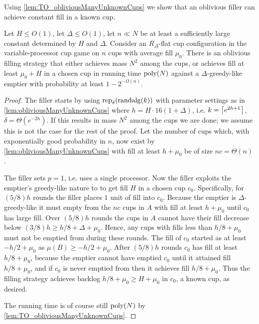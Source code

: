 Using \cref{lem:TO_obliviousManyUnknownCups} we show that an
oblivious filler can achieve constant fill in a known cup.
\begin{proposition}
  \label{prop:TO_obliviousBase}
  Let $H \le O(1)$, let $\Delta \le O(1)$, let $n\ll N$ be at least a
  sufficiently large constant determined by $H$ and $\Delta$. 
  Consider an $R_\Delta$-flat cup configuration in the variable-processor cup
  game on $n$ cups with average fill $\mu_0$.
  There is an oblivious filling strategy that either
  achieves mass $N^2$ among the cups, or achieves fill at least $\mu_0 + H$
  in a chosen cup in running time $\operatorname{\text{poly}}(N)$ against a
  $\Delta$-greedy-like emptier with probability at least $1-2^{-\Omega(n)}.$
\end{proposition}
\begin{proof}
  The filler starts by using $\operatorname{\text{\textup{rep}}}_\delta(\operatorname{\text{\textup{randalg}}}(k))$ with
  parameter settings as in \cref{lem:obliviousManyUnknownCups}
  where $h = H\cdot 16(1+\Delta)$, i.e. $k = \left\lceil e^{2h+1} \right\rceil$,
  $\delta = \Theta(e^{-2h})$. 
  If this results in mass $N^2$ among the cups we are done; we
  assume this is not the case for the rest of the proof.
  Let the number of cups which, with exponentially good
  probability in $n$, now exist by
  \cref{lem:obliviousManyUnknownCups} with
  fill at least $h+\mu_0$ be of size $nc = \Theta(n)$.

  The filler sets $p=1$, i.e. uses a single processor. Now the
  filler exploits the emptier's greedy-like nature to to get fill
  $H$ in a chosen cup $c_0$. Specifically, for $(5/8)h$ rounds
  the filler places $1$ unit of fill into $c_0$. Because the
  emptier is $\Delta$-greedy-like it must empty from the $nc$
  cups in $A$ with fill at least $h+\mu_0$ until $c_0$ has large
  fill. Over $(5/8)h$ rounds the cups in $A$ cannot have their
  fill decrease below $(3/8)h \ge h/8 + \Delta + \mu_0$. Hence,
  any cups with fills less than $h/8+\mu_0$ must not be emptied
  from during these rounds. The fill of $c_0$ started as at least
  $-h/2+\mu_0$ as $\mu(B) \ge -h/2+\mu_0$. After $(5/8)h$ rounds
  $c_0$ has fill at least $h/8+\mu_0$, because the emptier cannot
  have emptied $c_0$ until it attained fill $h/8+\mu_0$, and if
  $c_0$ is never emptied from then it achieves fill $h/8+\mu_0$.
  Thus the filling strategy achieves backlog $h/8 +\mu_0 \ge H +
  \mu_0$ in $c_0$, a known cup, as desired.

  The running time is of course still $\operatorname{\text{poly}}(N)$ by
  \cref{lem:TO_obliviousManyUnknownCups}.
\end{proof}

